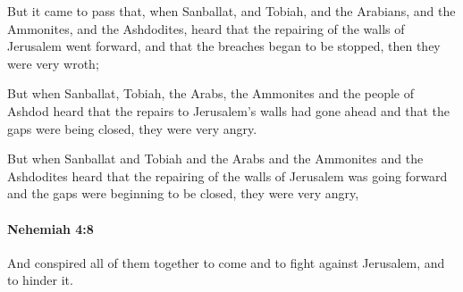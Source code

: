 			\begin{versebox}
					\item[BHS] 
					\item[LXX] 
					\item[ASV] But it came to pass that, when Sanballat, and Tobiah, and the Arabians, and the Ammonites, and the Ashdodites, heard that the repairing of the walls of Jerusalem went forward, and that the breaches began to be stopped, then they were very wroth;
					\item[NIV] But when Sanballat, Tobiah, the Arabs, the Ammonites and the people of Ashdod heard that the repairs to Jerusalem’s walls had gone ahead and that the gaps were being closed, they were very angry.
					\item[NRSV] But when Sanballat and Tobiah and the Arabs and the Ammonites and the Ashdodites heard that the repairing of the walls of Jerusalem was going forward and the gaps were beginning to be closed, they were very angry,
			\end{versebox}

		\paragraph{Nehemiah 4:8} %
			\label{NEHEMIAH-4-8}

			And conspired all of them together to come and to fight against Jerusalem, and to hinder it.

